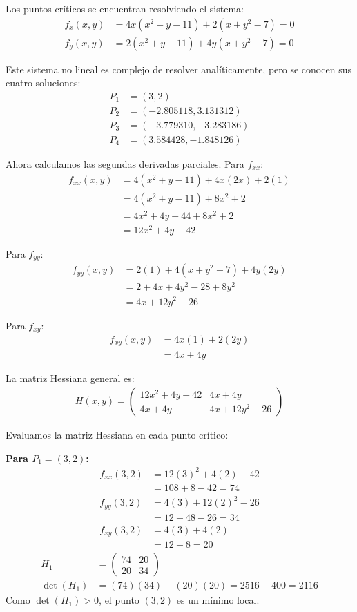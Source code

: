 \documentclass{article}
\begin{document}
Los puntos críticos se encuentran resolviendo el sistema:
\begin{align}
f_x(x,y) &= 4x(x^2 + y - 11) + 2(x + y^2 - 7) = 0 \\
f_y(x,y) &= 2(x^2 + y - 11) + 4y(x + y^2 - 7) = 0
\end{align}

Este sistema no lineal es complejo de resolver analíticamente, pero se conocen sus cuatro soluciones:
\begin{align}
P_1 &= (3, 2) \\
P_2 &= (-2.805118, 3.131312) \\
P_3 &= (-3.779310, -3.283186) \\
P_4 &= (3.584428, -1.848126)
\end{align}

Ahora calculamos las segundas derivadas parciales. Para $f_{xx}$:
\begin{align}
f_{xx}(x,y) &= 4(x^2 + y - 11) + 4x(2x) + 2(1) \\
&= 4(x^2 + y - 11) + 8x^2 + 2 \\
&= 4x^2 + 4y - 44 + 8x^2 + 2 \\
&= 12x^2 + 4y - 42
\end{align}

Para $f_{yy}$:
\begin{align}
f_{yy}(x,y) &= 2(1) + 4(x + y^2 - 7) + 4y(2y) \\
&= 2 + 4x + 4y^2 - 28 + 8y^2 \\
&= 4x + 12y^2 - 26
\end{align}

Para $f_{xy}$:
\begin{align}
f_{xy}(x,y) &= 4x(1) + 2(2y) \\
&= 4x + 4y
\end{align}

La matriz Hessiana general es:
\begin{align}
H(x,y) = \begin{pmatrix} 
12x^2 + 4y - 42 & 4x + 4y \\
4x + 4y & 4x + 12y^2 - 26
\end{pmatrix}
\end{align}

Evaluamos la matriz Hessiana en cada punto crítico:

\textbf{Para $P_1 = (3, 2)$:}
\begin{align}
f_{xx}(3,2) &= 12(3)^2 + 4(2) - 42 \\
&= 108 + 8 - 42 = 74 \\
f_{yy}(3,2) &= 4(3) + 12(2)^2 - 26 \\
&= 12 + 48 - 26 = 34 \\
f_{xy}(3,2) &= 4(3) + 4(2) \\
&= 12 + 8 = 20
\end{align}
\begin{align}
H_1 &= \begin{pmatrix} 74 & 20 \\ 20 & 34 \end{pmatrix} \\
\det(H_1) &= (74)(34) - (20)(20) = 2516 - 400 = 2116
\end{align}
Como $\det(H_1) > 0$, el punto $(3,2)$ es un mínimo local.
\end{document}
